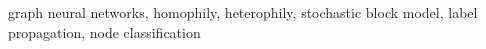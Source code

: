 graph neural networks, homophily, heterophily, stochastic block model, label propagation, node classification
